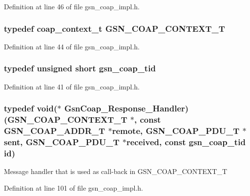 Definition at line 46 of file gsn\_\-coap\_\-impl.h.

\hypertarget{a00479_ab529666f5a53e57a0760df584886eb5b}{
\subsubsection[{GSN\_\-COAP\_\-CONTEXT\_\-T}]{\setlength{\rightskip}{0pt plus 5cm}typedef coap\_\-context\_\-t {\bf GSN\_\-COAP\_\-CONTEXT\_\-T}}}
\label{a00479_ab529666f5a53e57a0760df584886eb5b}


Definition at line 44 of file gsn\_\-coap\_\-impl.h.

\hypertarget{a00479_adc7d7e60daa14476026edb6edc26b0d6}{
\subsubsection[{gsn\_\-coap\_\-tid}]{\setlength{\rightskip}{0pt plus 5cm}typedef unsigned short {\bf gsn\_\-coap\_\-tid}}}
\label{a00479_adc7d7e60daa14476026edb6edc26b0d6}


Definition at line 41 of file gsn\_\-coap\_\-impl.h.

\hypertarget{a00479_ab7f36da79cbe8ef013039d64a86a29ae}{
\subsubsection[{GsnCoap\_\-Response\_\-Handler}]{\setlength{\rightskip}{0pt plus 5cm}typedef void($\ast$ {\bf GsnCoap\_\-Response\_\-Handler})({\bf GSN\_\-COAP\_\-CONTEXT\_\-T} $\ast$, const {\bf GSN\_\-COAP\_\-ADDR\_\-T} $\ast$remote, {\bf GSN\_\-COAP\_\-PDU\_\-T} $\ast$sent, {\bf GSN\_\-COAP\_\-PDU\_\-T} $\ast$received, const {\bf gsn\_\-coap\_\-tid} id)}}
\label{a00479_ab7f36da79cbe8ef013039d64a86a29ae}
Message handler that is used as call-\/back in GSN\_\-COAP\_\-CONTEXT\_\-T 

Definition at line 101 of file gsn\_\-coap\_\-impl.h.



